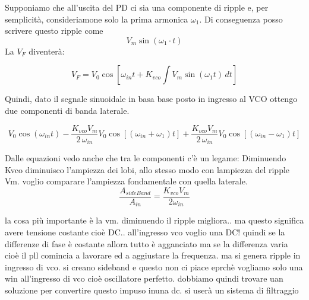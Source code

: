 Supponiamo che all'uscita del PD ci sia una componente di ripple e, per semplicità, consideriamone solo la prima armonica $\omega_1$.
Di conseguenza posso scrivere questo ripple come
\begin{equation}
    V_m \sin{(\omega_1 \cdot t)}
\end{equation}
La $V_F$ diventerà:

\begin{equation}
    V_F=V_0\cos{\left[ \omega_{in}t +K_{vco}\int {V_m\sin{(\omega_1 t)\, dt}}\right]}
\end{equation}

Quindi, dato il segnale sinuoidale in basa base posto in ingresso al VCO ottengo due componenti di banda laterale.

\begin{equation}
    V_0\cos{( \omega_{in}t)} - \frac{K_{vco}V_m}{2 \, \omega_{in}}V_0\cos{\left[(\omega_{in}+\omega_1)t\right]}+\frac{K_{vco}V_m}{2 \, \omega_{in}}V_0\cos{\left[(\omega_{in}-\omega_1)t\right]}
\end{equation}

Dalle equazioni vedo anche che tra le componenti c'è un legame:
Diminuendo Kvco diminuisco l'ampiezza dei lobi, allo stesso modo con lampiezza del ripple Vm.
voglio comparare l'ampiezza fondamentale con quella laterale. 
\begin{equation}
    \frac{A_{sideBand}}{A_{in}}=\dfrac{K_{vco}V_m}{2\omega_{in}}
\end{equation}

la cosa più importante è la vm. diminuendo il ripple migliora.. ma questo significa avere tensione costante cioè DC.. all'ingresso vco voglio una DC!
quindi se la differenze di fase è costante allora tutto è agganciato ma se la differenza varia cioè il pll comincia a
lavorare ed a aggiustare la frequenza. 
ma si genera ripple in ingresso di vco. si creano sideband e questo non ci piace eprchè vogliamo solo una win all'ingresso di vco cioè oscillatore perfetto. dobbiamo quindi trovare uan soluzione per convertire questo impuso inuna dc. si userà un sistema di filtraggio

{}%
{}%
%

